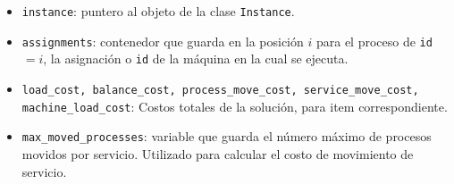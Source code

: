 \documentclass[../informe2.tex]{subfiles}
\begin{document}
\vspace{1cm}

\noindent\begin{minipage}{0.55\textwidth}
	\small
	\begin{itemize}[leftmargin=*]
		\item \texttt{instance}: puntero al objeto de la clase \texttt{Instance}.
		\item \texttt{assignments}: contenedor que guarda en la posición $i$ para el proceso de \texttt{id} $=i$, la asignación o \texttt{id} de la máquina en la cual se ejecuta.
		\item \texttt{load\_cost, balance\_cost, process\_move\_cost, service\_move\_cost, machine\_load\_cost}: Costos totales de la solución, para item correspondiente.
		\item \texttt{max\_moved\_processes}: variable que guarda el número máximo de procesos movidos por servicio. Utilizado para calcular el costo de movimiento de servicio.
	\end{itemize}
\end{minipage}\hfill
\begin{minipage}{0.4\textwidth}
\end{minipage}

\vspace{1cm}
\end{document}
